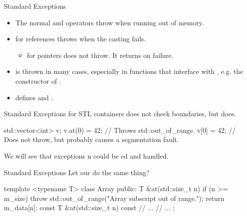 \documentclass{beamer}
\begin{document}
\begin{frame}{Standard Exceptions}
    \begin{itemize}
        \item The normal  and \ttt{[]} operators throw  when running out of memory.
        \item {} for references throws  when the casting fails.
        \begin{itemize}
            \item {} for pointers does not throw. It returns  on failure.
        \end{itemize}
        \pause
        \item {} is thrown in many cases, especially in functions that interface with , e.g. the constructor of .
        \item {} defines  and .
    \end{itemize}
\end{frame}

\begin{frame}[fragile]{Standard Exceptions}
     for STL containers does not check boundaries, but  does.
    \begin{cpp}
std::vector<int> v;
v.at(0) = 42; // Throws std::out_of_range.
v[0] = 42; // Does not throw, but probably causes a segmentation fault.
    \end{cpp}
    We will see that exceptions n could be ed and handled.
\end{frame}

\begin{frame}[fragile]{Standard Exceptions}
    Let our  do the same thing?
    \begin{cpp}
template <typename T>
class Array {
 public:
  T &at(std::size_t n) {
    if (n >= m_size)
      throw std::out_of_range("Array subscript out of range.");
    return m_data[n];
  }
  const T &at(std::size_t n) const {
    // ...
  }
  // ...
};
    \end{cpp}
\end{frame}
\end{document}
